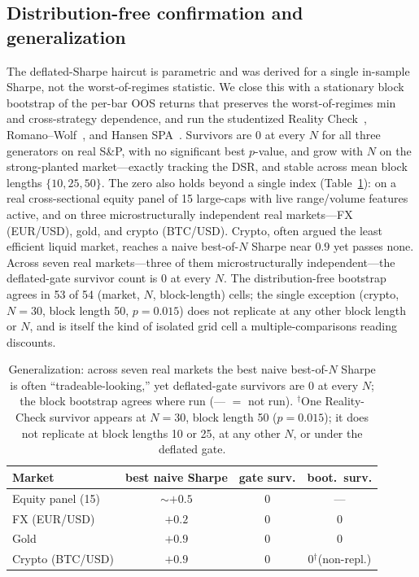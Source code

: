 \documentclass[sigconf]{acmart}
\begin{document}
\subsection{Distribution-free confirmation and generalization}
The deflated-Sharpe haircut is parametric and was derived for a single in-sample Sharpe, not the worst-of-regimes statistic. We close this with a stationary block bootstrap of the per-bar OOS returns that preserves the worst-of-regimes min and cross-strategy dependence, and run the studentized Reality Check~\cite{white2000}, Romano--Wolf~\cite{romanowolf2005}, and Hansen SPA~\cite{hansen2005}. Survivors are $0$ at every $N$ for all three generators on real S\&P, with no significant best $p$-value, and grow with $N$ on the strong-planted market---exactly tracking the DSR, and stable across mean block lengths $\{10,25,50\}$. The zero also holds beyond a single index (Table~\ref{tab:markets}): on a real cross-sectional equity panel of 15 large-caps with live range/volume features active, and on three microstructurally independent real markets---FX (EUR/USD), gold, and crypto (BTC/USD). Crypto, often argued the least efficient liquid market, reaches a naive best-of-$N$ Sharpe near $0.9$ yet passes none. Across seven real markets---three of them microstructurally independent---the deflated-gate survivor count is $0$ at every $N$. The distribution-free bootstrap agrees in 53 of 54 (market, $N$, block-length) cells; the single exception (crypto, $N{=}30$, block length 50, $p{=}0.015$) does not replicate at any other block length or $N$, and is itself the kind of isolated grid cell a multiple-comparisons reading discounts.

\begin{table}[t]
\caption{Generalization: across seven real markets the best naive best-of-$N$ Sharpe is often ``tradeable-looking,'' yet deflated-gate survivors are 0 at every $N$; the block bootstrap agrees where run (--- $=$ not run). $^{\dagger}$One Reality-Check survivor appears at $N{=}30$, block length 50 ($p{=}0.015$); it does not replicate at block lengths 10 or 25, at any other $N$, or under the deflated gate.}
\label{tab:markets}
\small
\begin{tabular}{@{}lccc@{}}
\toprule
Market & best naive Sharpe & gate surv. & boot.\ surv. \\
\midrule
Equity panel (15) & ${\sim}+0.5$ & 0 & --- \\
FX (EUR/USD) & $+0.2$ & 0 & 0 \\
Gold & $+0.9$ & 0 & 0 \\
Crypto (BTC/USD) & $+0.9$ & 0 & 0$^{\dagger}$(non-repl.) \\
\bottomrule
\end{tabular}
\end{table}
\end{document}
